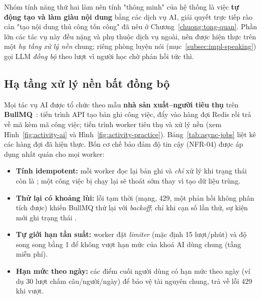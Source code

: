 Nhóm tính năng thứ hai làm nên tính "thông minh" của hệ thống là việc
\textbf{tự động tạo và làm giàu nội dung} bằng các dịch vụ AI, giải quyết
trực tiếp rào cản "tạo nội dung thủ công tốn công" đã nêu ở
Chương~\ref{chuong:tong-quan}. Phần lớn các tác vụ này đều nặng và phụ thuộc
dịch vụ ngoài, nên được hiện thực trên một \textit{hạ tầng xử lý nền} chung;
riêng phòng luyện nói (mục~\ref{subsec:impl-speaking}) gọi LLM \textit{đồng bộ}
theo lượt vì người học chờ phản hồi tức thì.

\subsection{Hạ tầng xử lý nền bất đồng bộ}
\label{subsec:impl-worker}

Mọi tác vụ AI được tổ chức theo mẫu \textbf{nhà sản xuất--người tiêu thụ}
trên \textbf{BullMQ}~\cite{bullmq2024}: tiến trình API tạo bản ghi công việc,
đẩy vào hàng đợi Redis rồi trả về mã  kèm mã công việc; tiến trình
worker tiêu thụ và xử lý nền (xem Hình~\ref{fig:activity-ai} và
Hình~\ref{fig:activity-practice}). Bảng~\ref{tab:async-jobs} liệt kê các hàng
đợi đã hiện thực. Bốn cơ chế bảo đảm độ tin cậy (NFR-04) được áp dụng nhất
quán cho mọi worker:

\begin{itemize}
  \item \textbf{Tính idempotent:} mỗi worker đọc lại bản ghi và \textit{chỉ}
        xử lý khi trạng thái còn là ; một công việc bị chạy lại
        sẽ thoát sớm thay vì tạo dữ liệu trùng.
  \item \textbf{Thử lại có khoảng lùi:} lỗi tạm thời (mạng, 429, một phản hồi
        không phân tích được) khiến BullMQ thử lại với \textit{backoff}; chỉ
        khi cạn số lần thử, sự kiện  mới ghi trạng thái
        .
  \item \textbf{Tự giới hạn tần suất:} worker đặt \textit{limiter} (mặc định
        15 lượt/phút) và độ song song bằng 1 để không vượt hạn mức của khoá
        AI dùng chung (tầng miễn phí).
  \item \textbf{Hạn mức theo ngày:} các điểm cuối người dùng có hạn mức theo
        ngày (ví dụ 30 lượt chấm câu/người/ngày) để bảo vệ tài nguyên chung,
        trả về lỗi 429 khi vượt.
\end{itemize}

